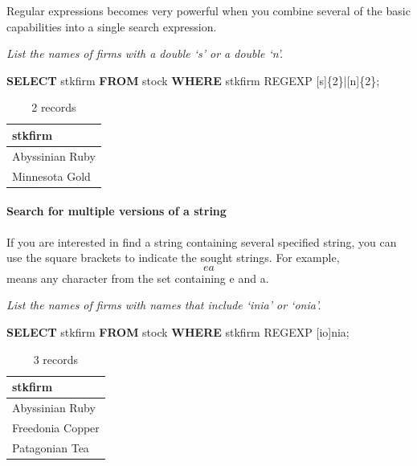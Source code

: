 \documentclass[
]{article}
\newenvironment{Shaded}{\begin{snugshade}}{\end{snugshade}}
\newcommand{\KeywordTok}[1]{\textcolor[rgb]{0.13,0.29,0.53}{\textbf{#1}}}
\newcommand{\NormalTok}[1]{#1}
\newcommand{\StringTok}[1]{\textcolor[rgb]{0.31,0.60,0.02}{#1}}
\begin{document}
Regular expressions becomes very powerful when you combine several of
the basic capabilities into a single search expression.

\emph{List the names of firms with a double `s' or a double `n'.}

\begin{Shaded}
\begin{Highlighting}[]
\KeywordTok{SELECT}\NormalTok{ stkfirm }\KeywordTok{FROM}\NormalTok{ stock }\KeywordTok{WHERE}\NormalTok{ stkfirm REGEXP }\StringTok{\textquotesingle{}[s]\{2\}|[n]\{2\}\textquotesingle{}}\NormalTok{;}
\end{Highlighting}
\end{Shaded}

\begin{table}

\caption{\label{tab:unnamed-chunk-49}2 records}
\centering
\begin{tabular}[t]{l}
\hline
stkfirm\\
\hline
Abyssinian Ruby\\
\hline
Minnesota Gold\\
\hline
\end{tabular}
\end{table}

\hypertarget{search-for-multiple-versions-of-a-string}{%
\paragraph*{Search for multiple versions of a string}\label{search-for-multiple-versions-of-a-string}}

If you are interested in find a string containing several specified
string, you can use the square brackets to indicate the sought strings.
For example, \[ea\] means any character from the set containing e and a.

\emph{List the names of firms with names that include `inia' or `onia'.}

\begin{Shaded}
\begin{Highlighting}[]
\KeywordTok{SELECT}\NormalTok{ stkfirm }\KeywordTok{FROM}\NormalTok{ stock }\KeywordTok{WHERE}\NormalTok{ stkfirm REGEXP }\StringTok{\textquotesingle{}[io]nia\textquotesingle{}}\NormalTok{;}
\end{Highlighting}
\end{Shaded}

\begin{table}

\caption{\label{tab:unnamed-chunk-50}3 records}
\centering
\begin{tabular}[t]{l}
\hline
stkfirm\\
\hline
Abyssinian Ruby\\
\hline
Freedonia Copper\\
\hline
Patagonian Tea\\
\hline
\end{tabular}
\end{table}
\end{document}
